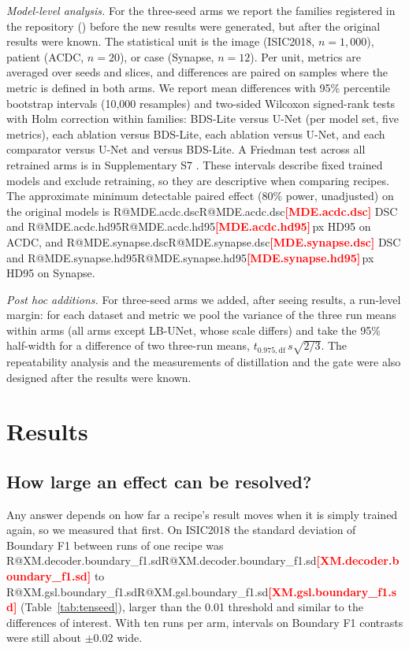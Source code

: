 \documentclass[fleqn,10pt,lineno]{wlpeerj}
\makeatletter
\newcommand{\R}[1]{\ifcsname R@#1\endcsname\csname R@#1\endcsname\else\textbf{\textcolor{red}{[#1]}}\fi}
\makeatother
\begin{document}
\emph{Model-level analysis.} For the three-seed arms we report the families registered in the repository () before the new results were generated, but after the original results were known. The statistical unit is the image (ISIC2018, $n=1{,}000$), patient (ACDC, $n=20$), or case (Synapse, $n=12$). Per unit, metrics are averaged over seeds and slices, and differences are paired on samples where the metric is defined in both arms. We report mean differences with 95\% percentile bootstrap intervals (10,000 resamples) and two-sided Wilcoxon signed-rank tests with Holm correction within families: BDS-Lite versus U-Net (per model set, five metrics), each ablation versus BDS-Lite, each ablation versus U-Net, and each comparator versus U-Net and versus BDS-Lite. A Friedman test across all retrained arms is in Supplementary S7 \citep{Demsar2006Statistical}. These intervals describe fixed trained models and exclude retraining, so they are descriptive when comparing recipes. The approximate minimum detectable paired effect (80\% power, unadjusted) on the original models is \R{MDE.acdc.dsc} DSC and \R{MDE.acdc.hd95}\,px HD95 on ACDC, and \R{MDE.synapse.dsc} DSC and \R{MDE.synapse.hd95}\,px HD95 on Synapse.

\emph{Post hoc additions.} For three-seed arms we added, after seeing results, a run-level margin: for each dataset and metric we pool the variance of the three run means within arms (all arms except LB-UNet, whose scale differs) and take the 95\% half-width for a difference of two three-run means, $t_{0.975,\mathrm{df}}\,s\sqrt{2/3}$. The repeatability analysis and the measurements of distillation and the gate were also designed after the results were known.

\section*{Results}

\subsection*{How large an effect can be resolved?}
Any answer depends on how far a recipe's result moves when it is simply trained again, so we measured that first. On ISIC2018 the standard deviation of Boundary F1 between runs of one recipe was \R{XM.decoder.boundary_f1.sd} to \R{XM.gsl.boundary_f1.sd} (Table~\ref{tab:tenseed}), larger than the 0.01 threshold and similar to the differences of interest. With ten runs per arm, intervals on Boundary F1 contrasts were still about $\pm0.02$ wide.
\end{document}
